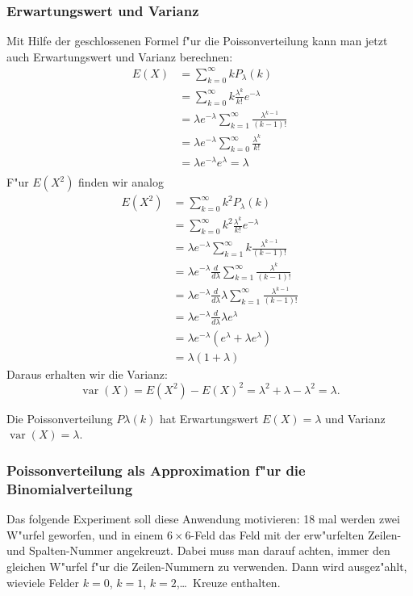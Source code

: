 \subsubsection{Erwartungswert und Varianz}
Mit Hilfe der geschlossenen Formel f"ur die Poissonverteilung kann man
jetzt auch Erwartungswert und Varianz berechnen:
\begin{align*}
E(X)
&=\sum_{k=0}^\infty kP_\lambda(k)\\
&=\sum_{k=0}^\infty k\frac{\lambda^k}{k!}e^{-\lambda}\\
&=\lambda e^{-\lambda}\sum_{k=1}^\infty\frac{\lambda^{k-1}}{(k-1)!}\\
&=\lambda e^{-\lambda}\sum_{k=0}^\infty\frac{\lambda^k}{k!}\\
&=\lambda e^{-\lambda}e^\lambda=\lambda\\
\end{align*}
F"ur $E(X^2)$ finden wir analog
\begin{align*}
E(X^2)
&=\sum_{k=0}^\infty k^2P_\lambda(k)\\
&=\sum_{k=0}^\infty k^2\frac{\lambda^k}{k!}e^{-\lambda}\\
&=\lambda e^{-\lambda}\sum_{k=1}^\infty k\frac{\lambda^{k-1}}{(k-1)!}\\
&=\lambda e^{-\lambda}\frac{d}{d\lambda}\sum_{k=1}^\infty \frac{\lambda^k}{(k-1)!}\\
&=\lambda e^{-\lambda}\frac{d}{d\lambda}\lambda\sum_{k=1}^\infty \frac{\lambda^{k-1}}{(k-1)!}\\
&=\lambda e^{-\lambda}\frac{d}{d\lambda}\lambda e^{\lambda}\\
&=\lambda e^{-\lambda}(e^\lambda+\lambda e^\lambda)\\
&=\lambda(1+\lambda)
\end{align*}
Daraus erhalten wir die Varianz:
\[
\operatorname{var}(X)=E(X^2)-E(X)^2=\lambda^2+\lambda -\lambda^2 =\lambda.
\]
\begin{satz}
Die Poissonverteilung $P\lambda(k)$ hat Erwartungswert
$E(X)=\lambda$ und Varianz $\operatorname{var}(X)=\lambda$.
\end{satz}

\subsubsection{Poissonverteilung als Approximation f"ur die Binomialverteilung}
Das folgende Experiment soll diese Anwendung motivieren: 18 mal werden zwei 
W"urfel geworfen, und in einem $6\times 6$-Feld das Feld mit der
erw"urfelten Zeilen- und Spalten-Nummer angekreuzt. Dabei muss man darauf
achten, immer den gleichen W"urfel f"ur die Zeilen-Nummern zu verwenden.
Dann wird ausgez"ahlt, wieviele Felder $k=0$, $k=1$, $k=2$,\dots\ Kreuze
enthalten.

